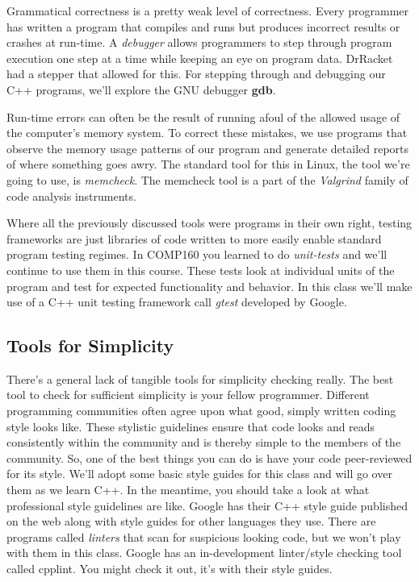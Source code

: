 \documentclass[]{tufte-handout}
\begin{document}
Grammatical correctness is a pretty weak level of correctness. Every programmer has written a program that compiles and runs but produces incorrect results or crashes at run-time. A \textit{debugger} allows programmers to step through program execution one step at a time while keeping an eye on program data. DrRacket had a stepper that allowed for this. For stepping through and debugging our C++ programs, we'll explore the GNU debugger \textbf{gdb}.

Run-time errors can often be the result of running afoul of the allowed usage of the computer's memory system.  To correct these mistakes, we use programs that observe the memory usage patterns of our program and generate detailed reports of where something goes awry. The standard tool for this in Linux, the tool we're going to use, is \textit{memcheck}. The memcheck tool is a part of the \textit{Valgrind} family of code analysis instruments.

Where all the previously discussed tools were programs in their own right, testing frameworks are just libraries of code written to more easily enable standard program testing regimes.  In COMP160 you learned to do \textit{unit-tests} and we'll continue to use them in this course. These tests look at individual units of the program and test for expected functionality and behavior.  In this class we'll make use of a C++ unit testing framework call \textit{gtest} developed by Google.  

\subsection{Tools for Simplicity}

There's a general lack of tangible tools for simplicity checking really. The best tool to check for sufficient simplicity is your fellow programmer.  Different programming communities often agree upon what good, simply written coding style looks like.  These stylistic guidelines ensure that code looks and reads consistently within the community and is thereby simple to the members of the community. So, one of the best things you can do is have your code peer-reviewed for its style. We'll adopt some basic style guides for this class and will go over them as we learn C++. In the meantime, you should take a look at what professional style guidelines are like. Google has their C++ style guide published on the web along with style guides for other languages they use. There are programs called \textit{linters} that scan for suspicious looking code, but we won't play with them in this class. Google has an in-development linter/style checking tool called cpplint.  You might check it out, it's with their style guides.
\end{document}
